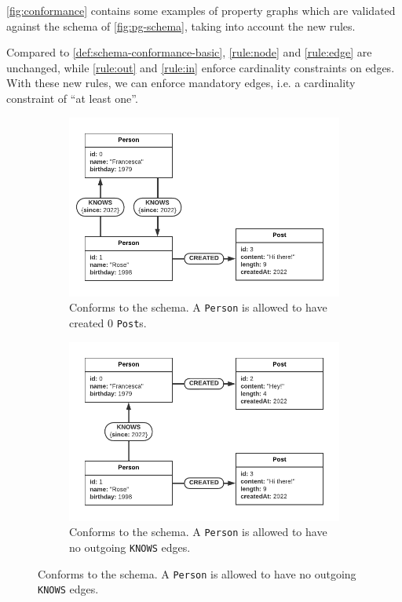 \documentclass{report}
\theoremstyle{definition}
\begin{document}
\autoref{fig:conformance} contains some examples of property graphs which are validated against the schema of \autoref{fig:pg-schema}, taking into account the new rules.

Compared to \autoref{def:schema-conformance-basic}, \autoref{rule:node} and \ref{rule:edge} are unchanged, while \autoref{rule:out} and \ref{rule:in} enforce cardinality constraints on edges. With these new rules, we can enforce mandatory edges, i.e. a cardinality constraint of ``at least one''.

\begin{figure}[t]
  \centering
  \begin{subfigure}[t]{0.45\textwidth}
    \centering
    \includegraphics[width=\textwidth]{figures/conformance-out.pdf}
    \caption{Conforms to the schema. A \texttt{Person} is allowed to have created 0 \texttt{Post}s.}
    \label{fig:conformance-node}
  \end{subfigure}
  \hfill
  \begin{subfigure}[t]{0.45\textwidth}
    \centering
    \includegraphics[width=\textwidth]{figures/conformance-out-2.pdf}
    \caption{Conforms to the schema. A \texttt{Person} is allowed to have no outgoing \texttt{KNOWS} edges.}
    \label{fig:conformance-edge}
  \end{subfigure}


\end{figure}
\end{document}
